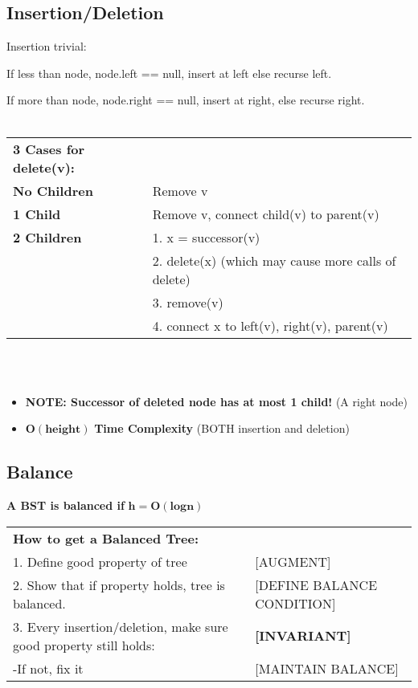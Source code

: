 \documentclass{article}
\begin{document}
    \pagebreak

    \subsection{Insertion/Deletion}

    Insertion trivial:
    
    If less than node, node.left == null, insert at left else recurse left. 
    
    If more than node, node.right == null, insert at right, else recurse right.\\\\


    \noindent\begin{tabular}{ll}
        \toprule
        \textbf{3 Cases for delete(v):} & \\
        \textbf{No Children}& Remove v\\
        \hline
        \textbf{1 Child}& Remove v, connect child(v) to parent(v)\\
        \hline
        \textbf{2 Children}& 1. x = successor(v)\\
        & 2. delete(x) (which may cause more calls of delete)\\
        & 3. remove(v)\\
        & 4. connect x to left(v), right(v), parent(v)\\
        \bottomrule
    \end{tabular}\\\\

    \begin{itemize}
        \item \textbf{NOTE: Successor of deleted node has at most 1 child!} (A right node)
        \item $\bm{O(height)}$ \textbf{Time Complexity} (BOTH insertion and deletion)
    \end{itemize}

    \subsection{Balance}

    \textbf{A BST is balanced if }$\bm{h = O(log n)}$

    \bigskip
    
    \noindent\begin{tabular}{ll}
        \textbf{How to get a Balanced Tree:}\\
        1. Define good property of tree & [AUGMENT]\\
        2. Show that if property holds, tree is balanced. & [DEFINE BALANCE CONDITION]\\
        3. Every insertion/deletion, make sure good property still holds: & \textbf{[INVARIANT]}\\
        -If not, fix it & [MAINTAIN BALANCE]\\
    \end{tabular}
\end{document}
